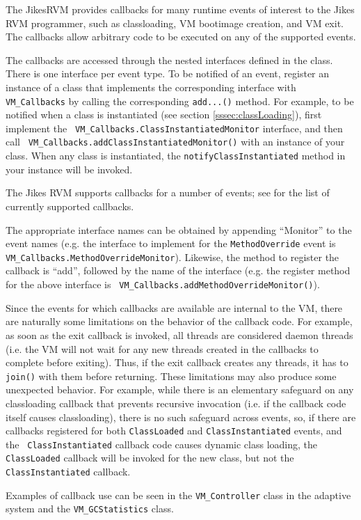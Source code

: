 

The Jikes\trademark RVM provides callbacks for many runtime events of
interest to the Jikes RVM 
programmer, such as classloading, VM bootimage creation, and VM exit.  The
callbacks allow arbitrary code to be executed on any of the supported events.

The callbacks are accessed through the nested interfaces defined in the 
class.  There is one interface per event type.  To be notified
of an event, register an instance of a class that implements the corresponding
interface with {\tt VM\_Callbacks} by calling the corresponding {\tt add...()}
method.  For example, to be notified when a class is instantiated (see section
\ref{sssec:classLoading}), first implement the {\tt
VM\_Callbacks.ClassInstantiatedMonitor} interface, and then call {\tt
VM\_Callbacks.addClassInstantiatedMonitor()} with an instance of your class.
When any class is instantiated, the {\tt notifyClassInstantiated} method in
your instance will be invoked.

The Jikes RVM supports callbacks for a number of events; see 
 for the list of currently
supported callbacks.

The appropriate interface names can be obtained by appending ``Monitor'' to the
event names (e.g. the interface to implement for the {\tt MethodOverride} event
is {\tt VM\_Callbacks.MethodOverrideMonitor}).  Likewise, the method to
register the callback is ``add'', followed by the name of the interface (e.g.
the register method for the above interface is {\tt
VM\_Callbacks.addMethodOverrideMonitor()}).

Since the events for which callbacks are available are internal to the VM,
there are naturally some limitations on the behavior of the callback code.  For
example, as soon as the exit callback is invoked, all threads are considered
daemon threads (i.e. the VM will not wait for any new threads created in the
callbacks to complete before exiting).  Thus, if the exit callback creates any
threads, it has to {\tt join()} with them before returning.  These limitations
may also produce some unexpected behavior.  For example, while there is an
elementary safeguard on any classloading callback that prevents recursive
invocation (i.e. if the callback code itself causes classloading), there is no
such safeguard across events, so, if there are callbacks registered for both
{\tt ClassLoaded} and {\tt ClassInstantiated} events, and the {\tt
ClassInstantiated} callback code causes dynamic class loading, the {\tt
ClassLoaded} callback will be invoked for the new class, but not the {\tt
ClassInstantiated} callback.

Examples of callback use can be seen in the {\tt VM\_Controller} class in the
adaptive system and the {\tt VM\_GCStatistics} class.

\JikesTMFooter
